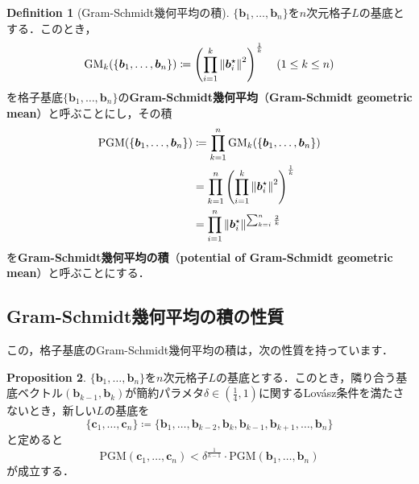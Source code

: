\documentclass[a4j, dvipdfmx]{jsarticle}
\theoremstyle{definition}
\newtheorem{definition}{Definition}[section]
\newtheorem{proposition}[definition]{Proposition}
\begin{document}
\begin{definition}[Gram-Schmidt幾何平均の積]
$\{\boldsymbol{b}_1,\ldots,\boldsymbol{b}_n\}$を$n$次元格子$L$の基底とする．このとき，
$$
\mathrm{GM}_k(\{\boldsymbol{b}_1,\ldots,\boldsymbol{b}_n\})\coloneqq \left(\prod_{i=1}^{k} \norm{\boldsymbol{b}_i^\star}^2\right)^{\frac{1}{k}}\quad (1\le k\le n)
$$
を格子基底$\{\boldsymbol{b}_1,\ldots,\boldsymbol{b}_n\}$の\textbf{Gram-Schmidt幾何平均}（\textbf{Gram-Schmidt geometric mean}）と呼ぶことにし，その積
$$
\begin{aligned}
\mathrm{PGM}(\{\boldsymbol{b}_1,\ldots,\boldsymbol{b}_n\})&\coloneqq \prod_{k=1}^n \mathrm{GM}_k(\{\boldsymbol{b}_1,\ldots,\boldsymbol{b}_n\})\\
&=\prod_{k=1}^{n}\left(\prod_{i=1}^{k} \norm{\boldsymbol{b}_i^\star}^2\right)^{\frac{1}{k}}\\
&=\prod_{i=1}^n \norm{\boldsymbol{b}_i^\star}^{\sum_{k=i}^n \frac{2}{k}}
\end{aligned}
$$
を\textbf{Gram-Schmidt幾何平均の積}（\textbf{potential of Gram-Schmidt geometric mean}）と呼ぶことにする．
\end{definition}

\subsection{Gram-Schmidt幾何平均の積の性質}

この，格子基底のGram-Schmidt幾何平均の積は，次の性質を持っています．

\begin{proposition}
$\{\boldsymbol{b}_1,\ldots,\boldsymbol{b}_n\}$を$n$次元格子$L$の基底とする．このとき，隣り合う基底ベクトル$(\boldsymbol{b}_{k-1}, \boldsymbol{b}_k)$が簡約パラメタ$\delta\in \left(\frac{1}{4}, 1\right)$に関するLovász条件を満たさないとき，新しい$L$の基底を
$$
\{\boldsymbol{c}_1,\ldots,\boldsymbol{c}_n\}\coloneqq \{\boldsymbol{b}_1,\ldots,\boldsymbol{b}_{k-2},\boldsymbol{b}_k,\boldsymbol{b}_{k-1},\boldsymbol{b}_{k+1},\ldots, \boldsymbol{b}_n\}
$$
と定めると
$$
\mathrm{PGM}(\boldsymbol{c}_1,\ldots,\boldsymbol{c}_n)<\delta^{\frac{1}{k-1}}\cdot\mathrm{PGM}(\boldsymbol{b}_1,\ldots,\boldsymbol{b}_n)
$$
が成立する．
\end{proposition}
\end{document}
